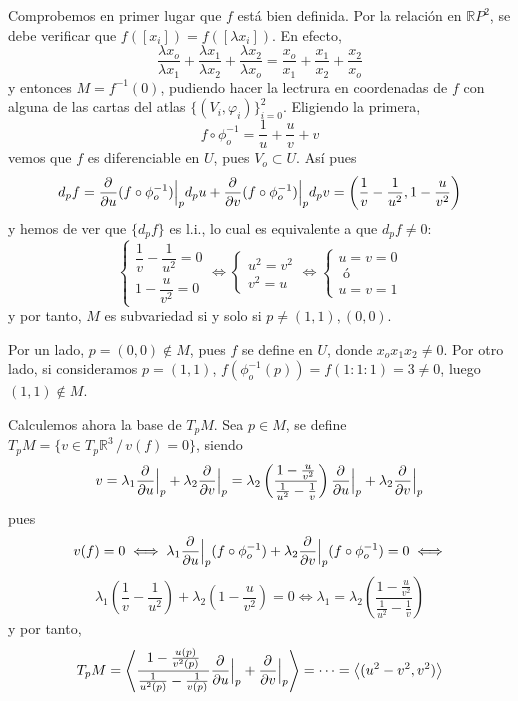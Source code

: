 \begin{sol}
    Comprobemos en primer lugar que $f$ est\'a bien definida. Por la relaci\'on en $\mathbb RP^2$, se debe verificar que $f([x_i])=f([\lambda x_i])$. En efecto,
    $$\dfrac{\lambda x_o}{\lambda x_1}+\dfrac{\lambda x_1}{\lambda x_2}+\dfrac{\lambda x_2}{\lambda x_o} = \dfrac{x_o}{x_1}+\dfrac{x_1}{x_2}+\dfrac{x_2}{x_o}$$
    y entonces $M=f^{-1}(0)$, pudiendo hacer la lectrura en coordenadas de $f$ con alguna de las cartas del atlas $\{(V_i, \varphi_i)\}_{i=0}^2$. Eligiendo la primera, 
    $$f\circ \phi_o^{-1}=\dfrac{1}{u} + \dfrac{u}{v}+v$$
    vemos que $f$ es diferenciable en $U$, pues $V_o \subset U$. As\'i pues
    $$d_pf=\dfrac{\partial^{} }{\partial u}(f\circ \phi_o^{-1})\Big|_p  d_pu +\dfrac{\partial^{} }{\partial v} (f\circ \phi_o^{-1})\Big|_p d_pv = \left(\dfrac{1}{v}-\dfrac{1}{u^2}, 1-\dfrac{u}{v^2}\right)$$
    y hemos de ver que $\{d_pf\}$ es l.i., lo cual es equivalente a que $d_pf\neq 0$:
    $$\begin{cases}
      \dfrac{1}{v}-\dfrac{1}{u^2}=0 \\[5mm] 1-\dfrac{u}{v^2}  =0
    \end{cases} \iff \begin{cases}
        u^2=v^2 \\ v^2=u
    \end{cases} \iff \begin{cases}
        u=v=0 \\ \text{ \'o } \\ u=v=1
    \end{cases}$$
    y por tanto, $M$ es subvariedad si y solo si $p\neq(1,1), (0,0)$.

    Por un lado, $p=(0,0)\nin M$, pues $f$ se define en $U$, donde $x_ox_1x_2\neq 0$. Por otro lado, si consideramos $p=(1,1)$, $f(\phi_o^{-1}(p))=f(1:1:1)=3\neq 0$, luego $(1,1)\nin M$.

    Calculemos ahora la base de $T_pM$. Sea $p\in M$, se define $T_pM=\{v \in T_p\mathbb R^3 \, /\, v(f)=0\}$, siendo
    $$v=\lambda_1 \dfrac{\partial^{} }{\partial u}\Big|_p + \lambda_2 \dfrac{\partial^{} }{\partial v}\Big|_p = \lambda_2 \left( \dfrac{1-\frac{u}{v^2}}{\frac{1}{u^2}-\frac{1}{v}}\right)\dfrac{\partial^{} }{\partial u}\Big|_p + \lambda_2 \dfrac{\partial^{} }{\partial v}\Big|_p  $$
    pues 
    $$v(f)=0 \iff \lambda_1 \dfrac{\partial^{} }{\partial u}\Big|_p(f\circ \phi_o^{-1}) + \lambda_2 \dfrac{\partial^{} }{\partial v}\Big|_p (f\circ \phi_o^{-1}) = 0 \iff $$
    $$\lambda_1 \left(\dfrac{1}{v}-\dfrac{1}{u^2}\right) + \lambda_2\left( 1-\dfrac{u}{v^2}\right)=0 \iff \lambda_1=\lambda_2 \left( \dfrac{1-\frac{u}{v^2}}{\frac{1}{u^2}-\frac{1}{v}}\right)$$
    y por tanto, 
    $$T_pM = \left\langle  \dfrac{1-\frac{u(p)}{v^2(p)}}{\frac{1}{u^2(p)}-\frac{1}{v(p)}} \dfrac{\partial^{} }{\partial u}\Big|_p +\dfrac{\partial^{} }{\partial v}\Big|_p \right\rangle = \cdots = \left\langle (u^2-v^2,v^2)\right\rangle$$
\end{sol}

